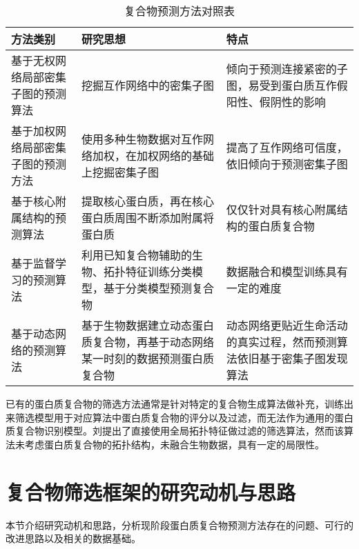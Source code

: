 \begin{table}[h]
  \centering
  \caption{复合物预测方法对照表}
  \label{tab:MethodSummary}
  \begin{tabular}{L{3cm}L{6cm}L{5cm}}
    \toprule
    \textbf{方法类别}          & \textbf{研究思想}                                                              & \textbf{特点}                                                          \\
    \midrule
    基于无权网络局部密集子图的预测算法     & 挖掘互作网络中的密集子图                                                       & 倾向于预测连接紧密的子图，易受到蛋白质互作假阳性、假阴性的影响         \\\hline
    基于加权网络局部密集子图的预测方法 & 使用多种生物数据对互作网络加权，在加权网络的基础上挖掘密集子图                 & 提高了互作网络可信度，依旧倾向于预测密集子图                           \\\hline
    基于核心附属结构的预测算法     & 提取核心蛋白质，再在核心蛋白质周围不断添加附属将蛋白质                         & 仅仅针对具有核心附属结构的蛋白质复合物                                 \\\hline
    基于监督学习的预测算法         & 利用已知复合物辅助的生物、拓扑特征训练分类模型，基于分类模型预测复合物         & 数据融合和模型训练具有一定的难度                                       \\\hline
    基于动态网络的预测算法       & 基于生物数据建立动态蛋白质复合物，再基于动态网络某一时刻的数据预测蛋白质复合物 & 动态网络更贴近生命活动的真实过程，然而预测算法依旧基于密集子图发现算法 \\
    \bottomrule
  \end{tabular}
\end{table}

已有的蛋白质复合物的筛选方法通常是针对特定的复合物生成算法做补充，训练出来筛选模型用于对应算法中蛋白质复合物的评分以及过滤，而无法作为通用的蛋白质复合物识别模型。刘\cite{liu_protein_2018}提出了直接使用全局拓扑特征做过滤的筛选算法，然而该算法未考虑蛋白质复合物的拓扑结构，未融合生物数据，具有一定的局限性。

\section{复合物筛选框架的研究动机与思路}
\label{section:intro:motivationAndThinking}

本节介绍研究动机和思路，分析现阶段蛋白质复合物预测方法存在的问题、可行的改进思路以及相关的数据基础。


